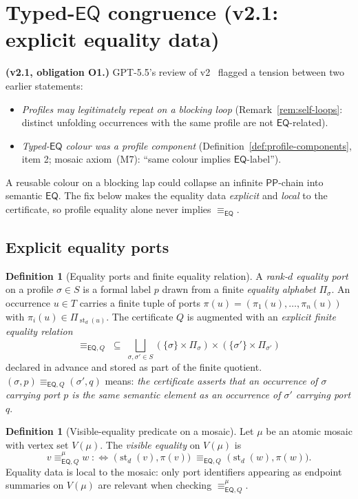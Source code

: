 \documentclass[11pt]{article}
\theoremstyle{definition}
\newtheorem{definition}[theorem]{Definition}
\theoremstyle{remark}
\newcommand{\PP}{\mathsf{PP}}
\newcommand{\EQ}{\mathsf{EQ}}
\newcommand{\st}{\operatorname{st}}
\newcommand{\eqcong}{\equiv_{\EQ}}
\newcommand{\eqQ}{\equiv_{\EQ,Q}}
\begin{document}
\section{Typed-$\EQ$ congruence (v2.1: explicit equality data)}
\label{sec:typed-eq}

\textbf{(v2.1, obligation O1.)}\;
GPT-5.5's review of v2~\cite{GPT55V2Review} flagged a tension
between two earlier statements:
\begin{itemize}
\item \emph{Profiles may legitimately repeat on a blocking loop}
  (Remark~\ref{rem:self-loops}: distinct unfolding occurrences with
  the same profile are not $\EQ$-related).
\item \emph{Typed-$\EQ$ colour was a profile component}
  (Definition~\ref{def:profile-components}, item 2; mosaic
  axiom~(M7): ``same colour implies $\EQ$-label'').
\end{itemize}
A reusable colour on a blocking lap could collapse an infinite
$\PP$-chain into semantic $\EQ$.  The fix below makes the equality
data \emph{explicit} and \emph{local} to the certificate, so profile
equality alone never implies $\eqcong$.

\subsection{Explicit equality ports}\label{sub:eq-ports}

\begin{definition}[Equality ports and finite equality
relation]\label{def:eq-ports}
A \emph{rank-$d$ equality port} on a profile $\sigma\in S$ is a
formal label $p$ drawn from a finite \emph{equality alphabet}
$\Pi_\sigma$.  An occurrence $u\in T$ carries a finite tuple of
ports $\pi(u) = (\pi_1(u),\ldots,\pi_n(u))$ with
$\pi_i(u)\in\Pi_{\st_d(u)}$.  The certificate $Q$ is augmented with
an \emph{explicit finite equality relation}
\[
\eqQ \;\subseteq\; \bigsqcup_{\sigma,\sigma'\in S}
       (\{\sigma\}\times\Pi_\sigma)\times(\{\sigma'\}\times\Pi_{\sigma'})
\]
declared in advance and stored as part of the finite quotient.
$(\sigma,p)\eqQ(\sigma',q)$ means: \emph{the certificate asserts
that an occurrence of $\sigma$ carrying port $p$ is the same
semantic element as an occurrence of $\sigma'$ carrying port $q$}.
\end{definition}

\begin{definition}[Visible-equality predicate on a mosaic]
\label{def:visible-eq}
Let $\mu$ be an atomic mosaic with vertex set $V(\mu)$.  The
\emph{visible equality} on $V(\mu)$ is
\[
v \mathrel{\eqQ^\mu} w
\;:\Longleftrightarrow\;
\bigl(\st_d(v),\pi(v)\bigr) \;\eqQ\; \bigl(\st_d(w),\pi(w)\bigr).
\]
Equality data is local to the mosaic: only port identifiers
appearing as endpoint summaries on $V(\mu)$ are relevant when
checking $\eqQ^\mu$.
\end{definition}
\end{document}
